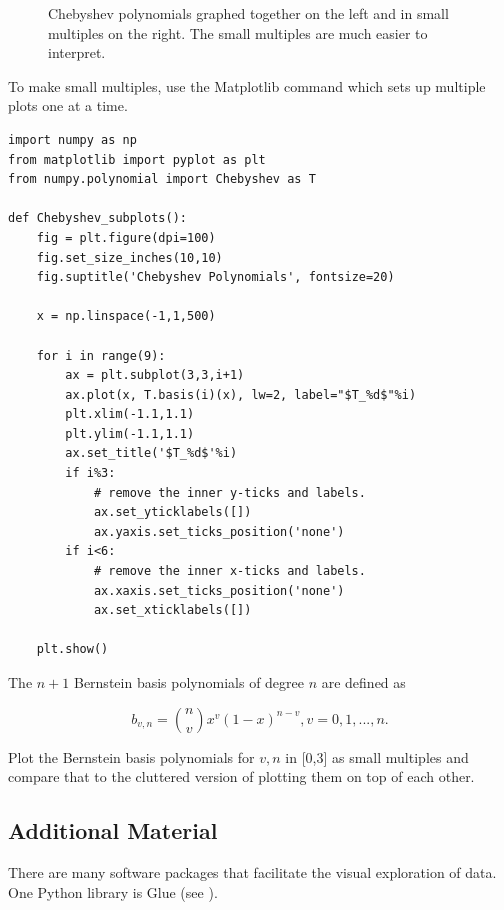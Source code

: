 \begin{figure}
\begin{subfigure}{.45\textwidth}
\end{subfigure}
\caption{Chebyshev polynomials graphed together on the left and in small multiples on the right.
The small multiples are much easier to interpret.}
\label{fig:PoT}
\end{figure}

To make small multiples, use the Matplotlib command  which sets up multiple plots one at a time.

\begin{lstlisting}
import numpy as np
from matplotlib import pyplot as plt
from numpy.polynomial import Chebyshev as T

def Chebyshev_subplots():
    fig = plt.figure(dpi=100)
    fig.set_size_inches(10,10)
    fig.suptitle('Chebyshev Polynomials', fontsize=20)

    x = np.linspace(-1,1,500)

    for i in range(9):
        ax = plt.subplot(3,3,i+1)
        ax.plot(x, T.basis(i)(x), lw=2, label="$T_%d$"%i)
        plt.xlim(-1.1,1.1)
        plt.ylim(-1.1,1.1)
        ax.set_title('$T_%d$'%i)
        if i%3:
            # remove the inner y-ticks and labels.
            ax.set_yticklabels([])
            ax.yaxis.set_ticks_position('none')
        if i<6:
            # remove the inner x-ticks and labels.
            ax.xaxis.set_ticks_position('none')
            ax.set_xticklabels([]) 

    plt.show()
\end{lstlisting}

\begin{problem} %
The $n+1$ Bernstein basis polynomials of degree $n$ are defined as 

$$b_{v,n} = {{n} \choose {v}} x^v (1-x)^{n-v}, v = 0, 1,..., n.$$

Plot the Bernstein basis polynomials for $v,n$ in [0,3] as small multiples and compare that to the cluttered version of plotting them on top of each other.
\end{problem}


\subsection*{Additional Material} %

There are many software packages that facilitate the visual exploration of data. 
One Python library is Glue (see \cite{glue}).

